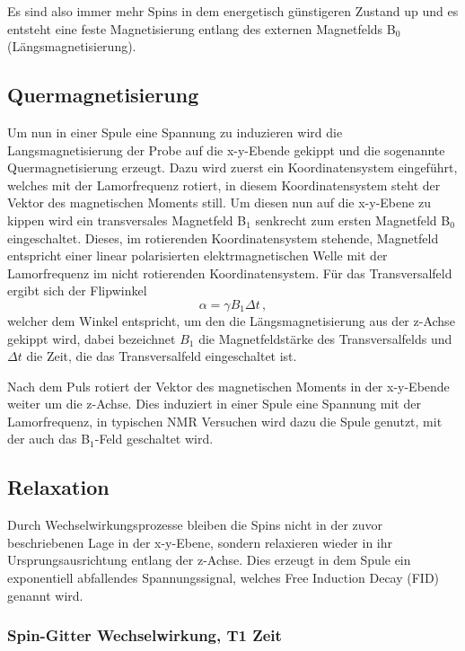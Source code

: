 Es sind also immer mehr Spins in dem energetisch günstigeren Zustand up und es entsteht eine feste Magnetisierung entlang des externen Magnetfelds B$_0$ (Längsmagnetisierung).

\subsection{Quermagnetisierung}

Um nun in einer Spule eine Spannung zu induzieren wird die Langsmagnetisierung der Probe auf die x-y-Ebende gekippt und die sogenannte Quermagnetisierung erzeugt.
Dazu wird zuerst ein Koordinatensystem eingeführt, welches mit der Lamorfrequenz rotiert, in diesem Koordinatensystem steht der Vektor des magnetischen Moments still.
Um diesen nun auf die x-y-Ebene zu kippen wird ein transversales Magnetfeld B$_1$ senkrecht zum ersten Magnetfeld B$_0$ eingeschaltet. Dieses, im rotierenden Koordinatensystem stehende, Magnetfeld entspricht einer linear polarisierten elektrmagnetischen Welle mit der Lamorfrequenz im nicht rotierenden Koordinatensystem.
Für das Transversalfeld ergibt sich der Flipwinkel
\begin{equation*}
  \alpha = \gamma B_1 \Delta t \, ,
\end{equation*}
welcher dem Winkel entspricht, um den die Längsmagnetisierung aus der z-Achse gekippt wird, dabei bezeichnet $B_1$ die Magnetfeldstärke des Transversalfelds und $\Delta t$ die Zeit, die das Transversalfeld eingeschaltet ist.

Nach dem Puls rotiert der Vektor des magnetischen Moments in der x-y-Ebende weiter um die z-Achse.
Dies induziert in einer Spule eine Spannung mit der Lamorfrequenz, in typischen NMR Versuchen wird dazu die Spule genutzt, mit der auch das B$_1$-Feld geschaltet wird.

\subsection{Relaxation}
Durch Wechselwirkungsprozesse bleiben die Spins nicht in der zuvor beschriebenen Lage in der x-y-Ebene, sondern relaxieren wieder in ihr Ursprungsausrichtung entlang der z-Achse.
Dies erzeugt in dem Spule ein exponentiell abfallendes Spannungssignal, welches Free Induction Decay (FID) genannt wird.

\subsubsection{Spin-Gitter Wechselwirkung, T1 Zeit}

